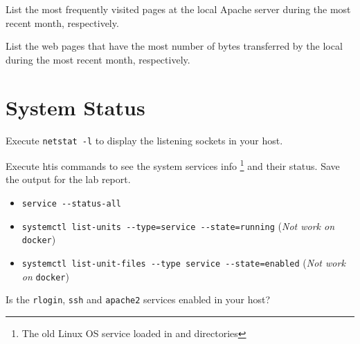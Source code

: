 \documentclass{../UTNetLab}
\begin{document}
    \begin{report}
    \item List the most frequently visited pages at the local Apache server during the most recent month, respectively.
    
    \item List the web pages that have the most number of bytes transferred by the local during the most recent month, respectively.
    \end{report}

\section{System Status}
    Execute \lstinline{netstat -l} to display the listening sockets in your host.

    Execute htis commands to see the system services info \footnote{The old Linux OS service loaded in and  directories} and their status.
    Save the output for the lab report.
    \begin{itemize}
        \item \lstinline{service --status-all}
        \item \lstinline{systemctl list-units --type=service --state=running} (\textit{Not work on} \lstinline{docker})
        \item \lstinline{systemctl list-unit-files --type service --state=enabled} (\textit{Not work on} \lstinline{docker})
    \end{itemize}
    
    \begin{report}
    \item Is the \lstinline{rlogin}, \lstinline{ssh} and \lstinline{apache2} services enabled in your host?
    \end{report}
\end{document}
